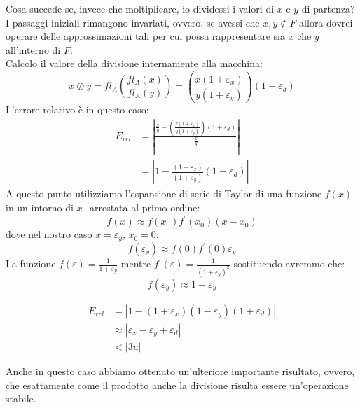 \documentclass[12pt, a4paper]{book}
\theoremstyle{definition}
\begin{document}
\begin{flushleft}
Cosa succede se, invece che moltiplicare, io dividessi i valori di $x$ e $y$ di partenza?\\
I passaggi iniziali rimangono invariati, ovvero, se avessi che $x,y \notin F$ allora dovrei operare delle approssimazioni tali per cui possa rappresentare sia $x$ che $y$ all'interno di $F$. \\
Calcolo il valore della divisione internamente alla macchina: 
\[ x \oslash y =  fl_{A}\left( \frac{fl_{A}(x)}{fl_{A}(y)}\right) = \left(\frac{x(1+\varepsilon_{x})}{y(1+\varepsilon_{y})} \right)(1+\varepsilon_{d})\]
L'errore relativo è in questo caso: 
\begin{equation} \label{}
	\begin{split}
		E_{rel} &=  \displaystyle\left\lvert \frac{ \frac{x}{y} -  \left(\frac{x(1+\varepsilon_{x})}{y(1+\varepsilon_{y})} \right)(1+\varepsilon_{d})}{ \frac{x}{y}} \right\rvert  \\
				   &=  \displaystyle\left\lvert 1 - \frac{(1+\varepsilon_{x})}{(1+\varepsilon_{y})}(1+\varepsilon_{d}) \right\rvert
	\end{split}
\end{equation}
A questo punto utilizziamo l'espansione di serie di Taylor di una funzione $f(x)$ in un intorno di $x_{0}$ arrestata al primo ordine: 
\[ f(x) \approx f(x_{0})f^{'}(x_{0})(x-x_{0})  \]
dove nel nostro caso $x = \varepsilon_{y}$, $x_{0} = 0$:
\[ f(\varepsilon_{y}) \approx f(0)f^{'}(0)\varepsilon_{y}  \]
La funzione $f(\varepsilon) = \frac{1}{1+\varepsilon_{y}} $ mentre $f^{'}(\varepsilon) = \frac{1}{(1+\varepsilon_{y})^{2}} $ sostituendo avremmo che: 
\[ f(\varepsilon_{y}) \approx 1-\varepsilon_{y} \]

\begin{equation} \label{}
	\begin{split}
		E_{rel}  &=  \displaystyle\left\lvert 1 - (1+\varepsilon_{x})(1-\varepsilon_{y})(1+\varepsilon_{d}) \right\rvert \\
					&\approx  \displaystyle\left\lvert \varepsilon_{x} -  \varepsilon_{y} +  \varepsilon_{d} \right\rvert \\
					& < |3u|
	\end{split}
\end{equation}

Anche in questo caso abbiamo ottenuto un'ulteriore importante risultato, ovvero, che esattamente come il prodotto anche la divisione risulta essere un'operazione stabile.

\end{flushleft}
\end{document}
